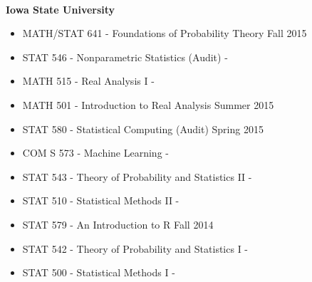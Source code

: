 \documentclass{res} %
\begin{document}
\begin{resume}
\hrulefill \\
{\bf Iowa State University }
\begin{itemize}\itemsep -2pt 
\item MATH/STAT 641 - Foundations of Probability Theory \dotfill Fall 2015
\item STAT 546 - Nonparametric Statistics (Audit) \hfill - 
\item MATH 515 - Real Analysis I \hfill -
\item MATH 501 - Introduction to Real Analysis \dotfill Summer 2015 
\item STAT 580 - Statistical Computing (Audit) \dotfill Spring 2015
\item COM S 573 - Machine Learning \hfill -
\item STAT 543 - Theory of Probability and Statistics II \hfill -
\item STAT 510 - Statistical Methods II \hfill -
\item STAT 579 - An Introduction to R \dotfill Fall 2014
\item STAT 542 - Theory of Probability and Statistics I \hfill -
\item STAT 500 - Statistical Methods I \hfill -
\end{itemize}



\end{resume} 
\end{document}
